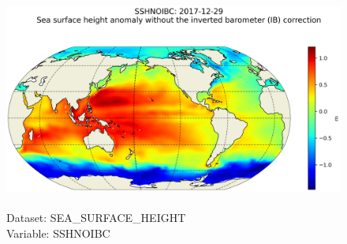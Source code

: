 \begin{figure}[H]
\centering
\includegraphics[scale=0.5]{../images/plots/latlon_plots/Sea_Surface_Height/SSHNOIBC.png}
\caption{\\Dataset: SEA\_SURFACE\_HEIGHT\\Variable: SSHNOIBC}
\label{tab:table-SEA_SURFACE_HEIGHT_SSHNOIBC-Plot}
\end{figure}